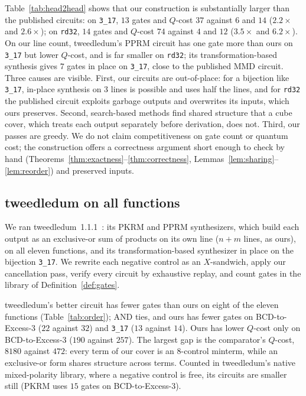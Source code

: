 \documentclass[conference]{IEEEtran}
\theoremstyle{plain}
\begin{document}
Table~\ref{tab:head2head} shows that our construction is substantially
larger than the published circuits: on \texttt{3\_17}, $13$ gates and
$Q$-cost $37$ against $6$ and $14$ ($2.2\times$ and $2.6\times$); on
\texttt{rd32}, $14$ gates and $Q$-cost $74$ against $4$ and $12$
($3.5\times$ and $6.2\times$). On our line count, tweedledum's PPRM
circuit has one gate more than ours on \texttt{3\_17} but lower $Q$-cost,
and is far smaller on \texttt{rd32}; its transformation-based synthesis
gives $7$ gates in place on \texttt{3\_17}, close to the published MMD
circuit. Three causes are visible. First, our circuits
are out-of-place: for a bijection like \texttt{3\_17}, in-place synthesis
on $3$ lines is possible and uses half the lines, and for \texttt{rd32}
the published circuit exploits garbage outputs and overwrites its inputs,
which ours preserves. Second, search-based methods find shared structure
that a cube cover, which treats each output separately before derivation,
does not. Third, our passes are greedy. We do not claim
competitiveness on gate count or quantum cost; the construction offers a
correctness argument short enough to check by hand
(Theorems~\ref{thm:exactness}--\ref{thm:correctness},
Lemmas~\ref{lem:sharing}--\ref{lem:reorder}) and preserved inputs.

\subsection{tweedledum on all functions}
\label{sec:tools}
We ran tweedledum~1.1.1~\cite{schmitt2022}: its PKRM and PPRM synthesizers, which build each
output as an exclusive-or sum of products on its own line ($n+m$ lines,
as ours), on all eleven functions, and its transformation-based
synthesizer in place on the bijection \texttt{3\_17}. We rewrite each
negative control as an $X$-sandwich, apply our cancellation pass, verify
every circuit by exhaustive replay, and count gates in the library of
Definition~\ref{def:gates}.

tweedledum's better circuit has fewer gates than ours on eight of the
eleven functions (Table~\ref{tab:order}); AND ties, and ours has
fewer gates on BCD-to-Excess-3 ($22$ against $32$) and \texttt{3\_17}
($13$ against $14$). Ours has lower $Q$-cost only on BCD-to-Excess-3
($190$ against $257$). The largest gap is the comparator's $Q$-cost,
$8180$ against $472$: every term of our cover is an $8$-control minterm,
while an exclusive-or form shares structure across terms. Counted in
tweedledum's native mixed-polarity library, where a negative control is
free, its circuits are smaller still (PKRM uses $15$ gates on
BCD-to-Excess-3).
\end{document}
